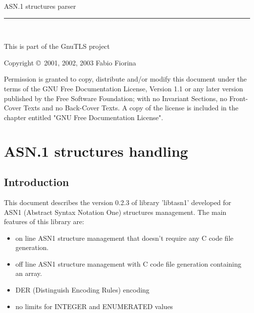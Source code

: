 \documentclass{book}
\newcommand{\HRule}{\rule{\linewidth}{0.4mm}}
\begin{document}
{\Large{ASN.1 structures parser}}
\vspace{-.3cm}
\\
\HRule
\vspace{-.6cm}
\\
\begin{flushright}
This is part of the GnuTLS project\\
\end{flushright}


\begin{center}
\par
Copyright \copyright\ 2001, 2002, 2003  Fabio Fiorina\\
\setlength{\parskip}{4mm}
\par
Permission is granted to copy, distribute and/or modify this
document under the terms of the GNU Free Documentation License,
Version 1.1 or any later version published by the Free Software
Foundation; with no Invariant Sections, no Front-Cover Texts and
no Back-Cover Texts.  A copy of the license is included in the
chapter entitled "GNU Free Documentation License".
\end{center}

\setlength{\parindent}{2mm}

\setlength{\parskip}{1mm}

\tableofcontents

\chapter{ASN.1 structures handling}

\section{Introduction}
 This document describes the version 0.2.3 of library 'libtasn1' developed
for ASN1 (Abstract Syntax Notation One) structures management.
The main features of this library are:
\begin{itemize}
\item on line ASN1 structure management that doesn't require any
C code file generation.
\item off line ASN1 structure management with C code file generation 
containing an array.
\item DER (Distinguish Encoding Rules) encoding
\item no limits for INTEGER and ENUMERATED values  
\end{itemize}
\end{document}
